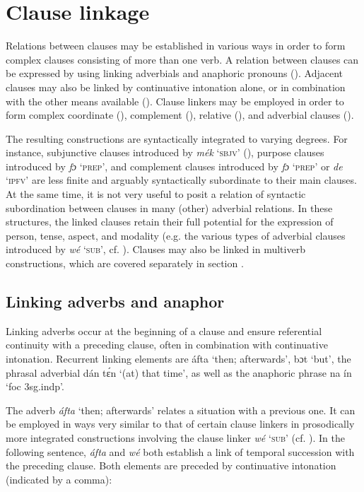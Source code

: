 \chapter{Clause linkage}
Relations between clauses may be established in various ways in order to form complex clauses consisting of more than one verb. A relation between clauses can be expressed by using linking adverbials and anaphoric pronouns (). Adjacent clauses may also be linked by continuative intonation alone, or in combination with the other means available (). Clause linkers may be employed in order to form complex coordinate (), complement (), relative (), and adverbial clauses (). 


The resulting constructions are syntactically integrated to varying degrees. For instance, subjunctive clauses introduced by \textit{mék} ‘\textsc{sbjv}’ (), purpose clauses introduced by \textit{fɔ} ‘\textsc{prep’}, and complement clauses introduced by \textit{fɔ} ‘\textsc{prep’} or \textit{de} ‘\textsc{ipfv’} are less finite and arguably syntactically subordinate to their main clauses. At the same time, it is not very useful to posit a relation of syntactic subordination between clauses in many (other) adverbial relations. In these structures, the linked clauses retain their full potential for the expression of person, tense, aspect, and modality (e.g. the various types of adverbial clauses introduced by \textit{wé} ‘\textsc{sub}’, cf. ). Clauses may also be linked in multiverb constructions, which are covered separately in section .


\section{Linking adverbs and anaphor}\label{sec:10.1}

Linking adverbs occur at the beginning of a clause and ensure referential continuity with a preceding clause, often in combination with continuative intonation. Recurrent linking elements are áfta ‘then; afterwards’, bɔt ‘but’, the phrasal adverbial dán tɛ́n ‘(at) that time’, as well as the anaphoric phrase na ín ‘foc 3sg.indp’. 


The adverb \textit{áfta} ‘then; afterwards’ relates a situation with a previous one. It can be employed in ways very similar to that of certain clause linkers in prosodically more integrated constructions involving the clause linker \textit{wé} ‘\textsc{sub}’ (cf. ). In the following sentence, \textit{áfta} and \textit{wé} both establish a link of temporal succession with the preceding clause. Both elements are preceded by continuative intonation (indicated by a comma): 



